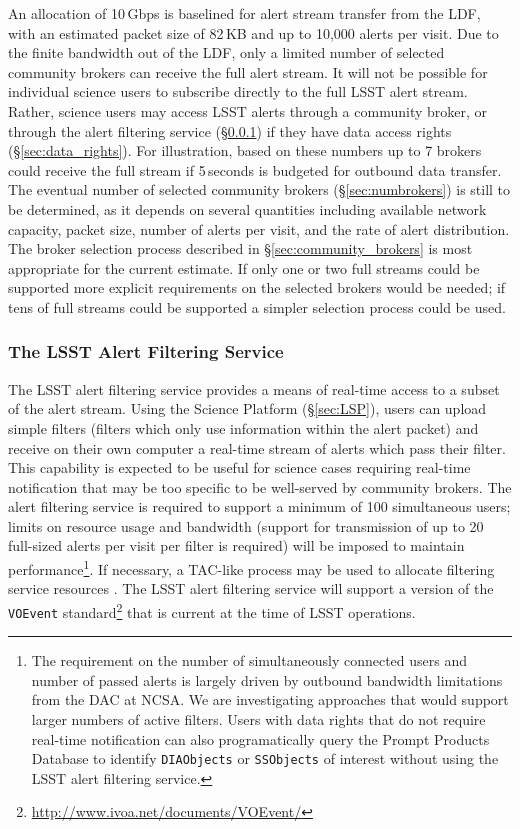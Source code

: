 An allocation of 10\,Gbps is baselined for alert stream transfer from the LDF, with an estimated packet size of 82\,KB and up to 10,000 alerts per visit.
Due to the finite bandwidth out of the LDF, only a limited number of selected community brokers can receive the full alert stream.
It will not be possible for individual science users to subscribe directly to the full LSST alert stream.
Rather, science users may access LSST alerts through a community broker, or through the alert filtering service (\S \ref{sec:filtering_service}) if they have data access rights (\S \ref{sec:data_rights}).
For illustration, based on these numbers up to 7 brokers could receive the full stream if 5\,seconds is budgeted for outbound data transfer.
The eventual number of selected community brokers (\S \ref{sec:numbrokers}) is still to be determined, as it depends on several quantities including available network capacity, packet size, number of alerts per visit, and the rate of alert distribution.
The broker selection process described in \S \ref{sec:community_brokers} is most appropriate for the current estimate.
If only one or two full streams could be supported more explicit requirements on the selected brokers would be needed; if tens of full streams could be supported a simpler selection process could be used.


\subsubsection{The LSST Alert Filtering Service}\label{sec:filtering_service}

The LSST alert filtering service provides a means of real-time access to a subset of the alert stream.
Using the Science Platform (\S \ref{sec:LSP}),
users can upload simple filters (filters which only use information within the alert packet) and receive on their own computer a real-time stream of alerts which pass their filter.
This capability is expected to be useful for science cases requiring real-time notification that may be too specific to be well-served by community brokers.
The alert filtering service is required to support a minimum of 100 simultaneous users; limits on resource usage and bandwidth (support for transmission of up to 20 full-sized alerts per visit per filter is required) will be imposed to maintain performance\footnote{
The requirement on the number of simultaneously connected users and number of passed alerts is largely driven by outbound bandwidth limitations from the DAC at NCSA.
We are investigating approaches that would support larger numbers of active filters.
Users with data rights that do not require real-time notification can also programatically query the Prompt Products Database to identify \texttt{DIAObjects} or \texttt{SSObjects} of interest without using the LSST alert filtering service.}.
If necessary, a TAC-like process may be used to allocate filtering service resources .
The LSST alert filtering service will support a version of the \texttt{VOEvent} standard\footnote{\url{http://www.ivoa.net/documents/VOEvent/}} that is current at the time of LSST operations.

